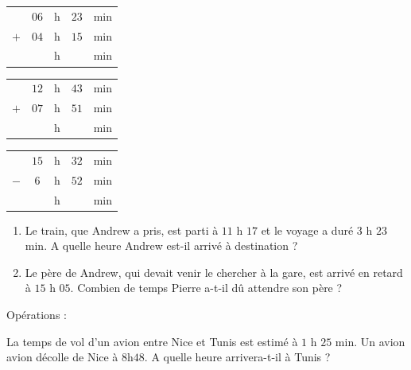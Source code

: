 \begin{pageAuto}
\begin{minipage}{0.30\linewidth}
\begin{tabular}{ccccc} 
& $06$ & h &  $23$ & min \\ 
$+$   & $04$ & h & $15$  & min\\ 
\hline 
   &  & h & & min\\
\end{tabular} 
\end{minipage}
\hfill 
\begin{minipage}{0.30\linewidth}
 \begin{tabular}{ccccc} 
& $12$ & h &  $43$ & min \\ 
$+$   & $07$ & h &  $51$ & min\\ 
\hline 
   &  & h & & min\\
\end{tabular} 
\end{minipage}
\hfill 
\begin{minipage}{0.30\linewidth}
 \begin{tabular}{ccccc} 
& $15$ & h & $32$  & min \\ 
$-$   & $6$ & h & $52$ & min\\ 
\hline 
   &  & h & & min\\
\end{tabular} 
\end{minipage}


\ExoAuto

\begin{minipage}{0.680\linewidth}
\begin{enumerate}
\item Le train, que Andrew a pris, est parti à $11$ h $17$ et le voyage a duré $3$ h $23$ min.
A quelle heure Andrew est-il arrivé à destination ? 


\item Le père de Andrew, qui devait venir le chercher à la gare, est arrivé en retard à $15$ h $05$.
Combien de temps Pierre a-t-il dû attendre son père ?
\end{enumerate}
\end{minipage}
\hfill \vrule \hfill 
\begin{minipage}{0.30\linewidth}Opérations :
\vspace{3cm}
\end{minipage}


\ExoAuto


\begin{minipage}{0.68\linewidth}
La temps de vol d'un avion entre Nice et Tunis est estimé à $1$ h $25$ min. 
Un avion avion décolle de Nice à $8$h$48$. A quelle heure arrivera-t-il à Tunis ?  
 

\end{minipage}
\end{pageAuto}
